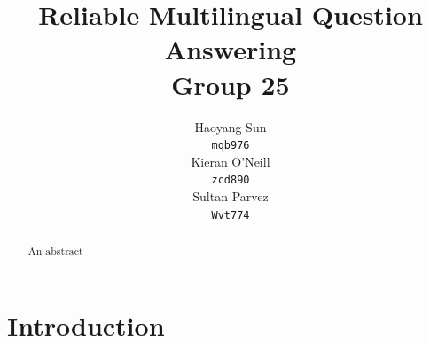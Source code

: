 \documentclass[11pt]{article}
\title{
  Reliable Multilingual Question Answering \\
  \large Group 25 
}
\author{Haoyang Sun \\
  \texttt{mqb976} \\\And
  Kieran O'Neill \\
  \texttt{zcd890} \\\And
  Sultan Parvez \\
  \texttt{Wvt774} \\}
\begin{document}
\maketitle

\begin{abstract}
An abstract
\end{abstract}

\section{Introduction}



\appendix
\end{document}
